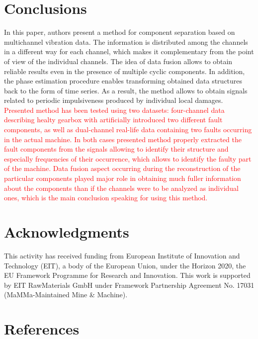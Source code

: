 \documentclass[3p,12pt]{elsarticle}
\begin{document}
\section{Conclusions}

In this paper, authors present a method for component separation based on multichannel vibration data. The information is distributed among the channels in a different way for each channel, which makes it complementary from the point of view of the individual channels. The idea of data fusion allows to obtain reliable results even in the presence of multiple cyclic components. In addition, the phase estimation procedure enables transforming obtained data structures back to the form of time series. As a result, the method allows to obtain signals related to periodic impulsiveness produced by individual local damages. \textcolor{red}{Presented method has been tested using two datasets: four-channel data describing healty gearbox with artificially introduced two different fault components, as well as dual-channel real-life data containing two faults occurring in the actual machine. In both cases presented method properly extracted the fault components from the signals allowing to identify their structure and especially frequencies of their occurrence, which allows to identify the faulty part of the machine. Data fusion aspect occurring during the reconstruction of the particular components played major role in obtaining much fuller information about the components than if the channels were to be analyzed as individual ones, which is the main conclusion speaking for using this method.}

\section*{Acknowledgments}
This activity has received funding from European Institute of Innovation and Technology (EIT), a body of the European Union, under the Horizon 2020, the EU Framework Programme for Research and Innovation. This work is supported by EIT RawMaterials GmbH under Framework Partnership
Agreement No. 17031 (MaMMa-Maintained Mine \& Machine).
\section*{References}


\end{document}
